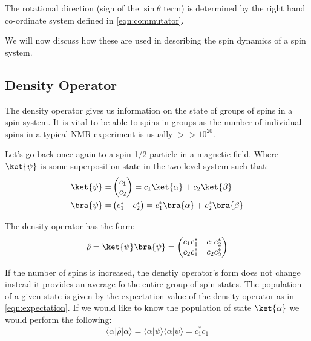The rotational direction (sign of the $\sin{\theta}$ term) is determined by the right hand co-ordinate system defined in \ref{eqn:commutator}.

We will now discuss how these are used in describing the spin dynamics of a spin system.

\subsection{Density Operator}

The density operator gives us information on the state of groups of spins in a spin system. It is
vital to be able to spins in groups as the number of individual spins in a typical NMR experiment is
usually $>>10^20$.

Let's go back once again to a spin-1/2 particle in a magnetic field. Where $\ket{\psi}$ is some superposition state in the two level system such that:
\begin{align}
\ket{\psi} =& \begin{pmatrix}
    c_1\\
    c_2
\end{pmatrix} = c_1\ket{\alpha} + c_2\ket{\beta}\\
\bra{\psi} =& \begin{pmatrix}
  c_1^* & c_2^*
\end{pmatrix} = c_1^*\bra{\alpha} + c_2^*\bra{\beta}
\end{align}

The density operator has the form:
\begin{equation}
  \hat\rho = \ket{\psi}\bra{\psi} = \begin{pmatrix}
    c_1c_1^* & c_1c_2^*\\
    c_2c_1^* & c_2c_2^*
\end{pmatrix}
\end{equation}

If the number of spins is increased, the denstiy operator's form does not change instead it provides
an average fo the entire group of spin states. The population of a given state is given by the expectation value of the density operator as in \ref{eqn:expectation}. If we would like to know
the population of state $\ket{\alpha}$ we would perform the following:
\begin{equation}
  \langle\alpha\vert\hat\rho\vert\alpha\rangle = \langle\alpha\vert\psi\rangle \langle\alpha\vert\psi\rangle = c_1^*c_1
\end{equation}

